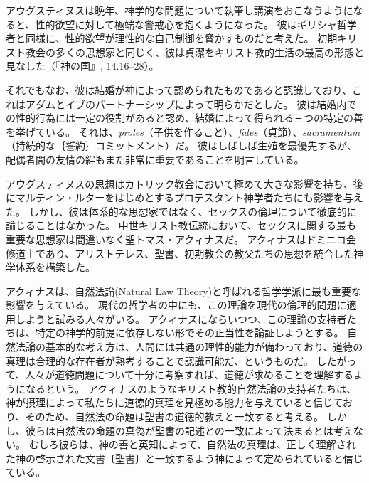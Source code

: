 \documentclass[paper=a4,book,openany]{jlreq}
\begin{document}
アウグスティヌスは晩年、神学的な問題について執筆し講演をおこなうようになると、性的欲望に対して極端な警戒心を抱くようになった。
彼はギリシャ哲学者と同様に、性的欲望が理性的な自己制御を脅かすものだと考えた。
初期キリスト教会の多くの思想家と同じく、彼は貞潔をキリスト教的生活の最高の形態と見なした（『神の国』, 14.16--28）。

\nocite{augustine98:_city_god_pagan}
\nocite{アウグスティヌス82岩波}
\nocite{アウグスティヌス76:告白岩波}

それでもなお、彼は結婚が神によって認められたものであると認識しており、これはアダムとイブのパートナーシップによって明らかだとした。
彼は結婚内での性的行為には一定の役割があると認め、結婚によって得られる三つの特定の善を挙げている。
それは、\emph{proles}（子供を作ること）、\emph{fides}（貞節）、\emph{sacramentum}（持続的な｛誓約｝{コミットメント}）だ。
彼はしばしば生殖を最優先するが、配偶者間の友情の絆もまた非常に重要であることを明言している\citep{augustine98:_excel_marriag}。

アウグスティヌスの思想はカトリック教会において極めて大きな影響を持ち、後にマルティン・ルターをはじめとするプロテスタント神学者たちにも影響を与えた。
しかし、彼は体系的な思想家ではなく、セックスの倫理について徹底的に論じることはなかった。
中世キリスト教伝統において、セックスに関する最も重要な思想家は間違いなく聖トマス・アクィナスだ。
アクィナスはドミニコ会修道士であり、アリストテレス、聖書、初期教会の教父たちの思想を統合した神学体系を構築した。

アクィナスは、自然法論(Natural Law Theory)と呼ばれる哲学学派に最も重要な影響を与えている。
現代の哲学者の中にも、この理論を現代の倫理的問題に適用しようと試みる人々がいる。
アクィナスにならいつつ、この理論の支持者たちは、特定の神学的前提に依存しない形でその正当性を論証しようとする。
自然法論の基本的な考え方は、人間には共通の理性的能力が備わっており、道徳の真理は合理的な存在者が熟考することで認識可能だ、というものだ。
したがって、人々が道徳問題について十分に考察すれば、道徳が求めることを理解するようになるという。
アクィナスのようなキリスト教的自然法論の支持者たちは、神が摂理によって私たちに道徳的真理を見極める能力を与えていると信じており、そのため、自然法の命題は聖書の道徳的教えと一致すると考える。
しかし、彼らは自然法の命題の真偽が聖書の記述との一致によって決まるとは考えない。
むしろ彼らは、神の善と英知によって、自然法の真理は、正しく理解された神の啓示された文書〔聖書〕と一致するよう神によって定められていると信じている。
\end{document}
